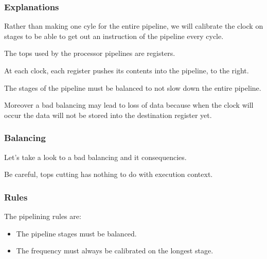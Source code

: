 
\begin{frame}
  \frametitle{Explanations}

  Rather than making one cyle for the entire pipeline, we will
  calibrate the clock on stages to be able to get out an instruction
  of the pipeline every cycle.

  \-

  The tops used by the processor pipelines are registers.

  \-

  At each clock, each register pushes its contents into the pipeline,
  to the right.

  \-

  The stages of the pipeline \alert{must} be balanced to not slow
  down the entire pipeline.

  \-

  Moreover a bad balancing may lead to loss of data because when the clock
  will occur the data will not be stored into the destination register yet.
\end{frame}


\begin{frame}
  \frametitle{Balancing}

  Let's take a look to a bad balancing and it consequencies.

  \begin{center}
  \end{center}

  Be careful, tops cutting has nothing to do with execution context.
\end{frame}


\begin{frame}
  \frametitle{Rules}

  The pipelining rules are:

  \begin{itemize}
    \item
      The pipeline stages must be balanced.
    \item
      The frequency must always be calibrated on the longest stage.
  \end{itemize}
\end{frame}


